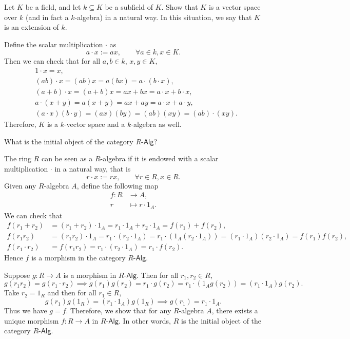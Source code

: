 \documentclass[12pt,letterpaper,boxed]{hmcpset}
\begin{document}
\begin{problem}[5.7]
Let $K$ be a field, and let $k \subseteq K$ be a subfield of $K$. Show that $K$ is a vector space over $k$ (and in fact a $k$-algebra) in a natural way. In this situation, we say that $K$ is an extension of $k.$
\end{problem}
\begin{solution}
	Define the scalar multiplication $\cdot$ as
	\[
	a\cdot x:=ax, \qquad\forall a\in k,x\in K.
	\]
	Then we can check that for all $a,b\in k$, $x,y\in K$,
	\begin{align*}
	&1\cdot x=x,\\
	&(ab)\cdot x=(ab) x=a(bx)=a\cdot(b\cdot x),\\
	&(a+b)\cdot x=(a+b)x=ax+bx=a\cdot x+b\cdot x,\\
	&a\cdot(x+y)=a(x+y)=ax+ay=a\cdot x+a\cdot y,\\
	&(a\cdot x)(b\cdot y)=(ax)(by)=(ab)(xy)=(ab)\cdot(xy).
	\end{align*}
	Therefore, $K$ is a $k$-vector space and a $k$-algebra as well.
\end{solution}

\begin{problem}[5.8]
	What is the initial object of the category $R$-$\mathsf{Alg}$?
\end{problem}
\begin{solution}
    The ring $R$ can be seen as a $R$-algebra if it is endowed with a scalar multiplication $\cdot$ in a natural way, that is 
	\[
	r\cdot x:=rx, \qquad\forall r\in R,x\in R.
	\]
	Given any $R$-algebra $A$, define the following map
	\begin{align*}
	f:R& \longrightarrow A,\\
	r& \longmapsto r\cdot 1_A.
	\end{align*}
	We can check that
	\begin{align*}
	f(r_1+r_2)&=(r_1+r_2)\cdot 1_A=r_1\cdot 1_A+r_2\cdot 1_A=f(r_1)+f(r_2),\\
	f(r_1r_2)&=(r_1r_2)\cdot 1_A=r_1\cdot(r_2\cdot 1_A)=r_1\cdot (1_A(r_2\cdot 1_A))=(r_1\cdot 1_A)(r_2\cdot 1_A)=f(r_1)f(r_2),\\
	f(r_1\cdot r_2)&=f(r_1r_2)=r_1\cdot(r_2\cdot 1_A)=r_1\cdot f(r_2).
	\end{align*}
	Hence $f$ is a morphism in the category $R$-$\mathsf{Alg}$.
	
	Suppose $g:R\to A$ is a morphism in $R$-$\mathsf{Alg}$. Then for all $r_1,r_2\in R$,
	\[
	g(r_1r_2)=g(r_1\cdot r_2)\implies g(r_1)g(r_2)=r_1\cdot g(r_2)=r_1\cdot(1_Ag(r_2))=(r_1\cdot1_A)g(r_2).
	\]
	Take $r_2=1_R$ and then for all $r_1\in R$,
	\[
	g(r_1)g(1_R)=(r_1\cdot1_A)g(1_R)\implies g(r_1)=r_1\cdot1_A.
	\]
	Thus we have $g=f$. Therefore, we show that for any $R$-algebra $A$, there exists a unique morphism $f:R\to A$ in $R$-$\mathsf{Alg}$. In other words, $R$ is the initial object of the category $R$-$\mathsf{Alg}$.
\end{solution}
\end{document}
